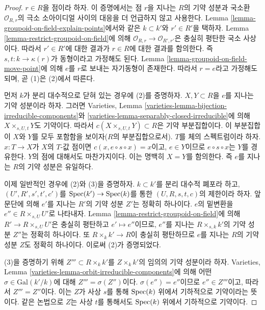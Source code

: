 \begin{proof}
$r \in R$을 점이라 하자. 이 증명에서는 점 $r$을 지나는 $R$의 기약 성분과
국소환 $\mathcal{O}_{R, r}$의 극소 소아이디얼 사이의 대응을 더 언급하지 않고
사용한다. Lemma \ref{lemma-groupoid-on-field-explain-points}에서와 같은
$k \subset k'$와 $r' \in R'$을 택하자. Lemma
\ref{lemma-restrict-groupoid-on-field}에 의해
$\mathcal{O}_{R, r} \to \mathcal{O}_{R', r'}$은 충실히 평탄한 국소 사상이다.
따라서 $r' \in R'$에 대한 결과가 $r \in R$에 대한 결과를 함의한다.
즉 $s, t : k \to \kappa(r)$가 동형이라고 가정해도 된다. Lemma
\ref{lemma-groupoid-on-field-move-point}에 의해 $e$를 $r$로 보내는
자기동형이 존재한다. 따라서 $r = e$라고 가정해도 되며, 곧 (1)은 (2)에서 따른다.

\medskip\noindent
먼저 $k$가 분리 대수적으로 닫혀 있는 경우에 (2)를 증명하자.
$X, Y \subset R$을 $e$를 지나는 기약 성분이라 하자. 그러면 Varieties, Lemma
\ref{varieties-lemma-bijection-irreducible-components}와
\ref{varieties-lemma-separably-closed-irreducible}에 의해
$X \times_{s, U, t} Y$도 기약이다. 따라서
$c(X \times_{s, U, t} Y) \subset R$은 기약 부분집합이다. 이 부분집합이
$X$와 $Y$를 모두 포함함을 보이자($R$의 부분집합으로서). $T$를 체의
스펙트럼이라 하자. $x : T \to X$가 $X$의 $T$-값 점이면
$c(x, e \circ s \circ x) = x$이고, $e \in Y$이므로
$e \circ s \circ x$는 $Y$를 경유한다. $Y$의 점에 대해서도 마찬가지이다.
이는 명백히 $X = Y$를 함의한다. 즉 $e$를 지나는 $R$의 기약 성분은 유일하다.

\medskip\noindent
이제 일반적인 경우에 (2)와 (3)을 증명하자. $k \subset k'$를 분리 대수적
폐포라 하고, $(U', R', s', t', c')$를 $\mathop{\mathrm{Spec}}(k') \to \mathop{\mathrm{Spec}}(k)$를 통한
$(U, R, s, t, c)$의 제한이라 하자. 앞 문단에 의해 $e'$를 지나는
$R'$의 기약 성분 $Z'$는 정확히 하나이다. $e$의 밑변환을
$e'' \in R \times_{s, U} U'$로 나타내자. Lemma
\ref{lemma-restrict-groupoid-on-field}에 의해
$R' \to R \times_{s, U} U'$은 충실히 평탄하고 $e' \mapsto e''$이므로,
$e''$를 지나는 $R \times_{s, k} k'$의 기약 성분 $Z''$는 정확히 하나이다.
또 $R \times_k k' \to R$이 충실히 평탄하므로 $e$를 지나는 $R$의
기약 성분 $Z$도 정확히 하나이다. 이로써 (2)가 증명되었다.

\medskip\noindent
(3)을 증명하기 위해 $Z''' \subset R \times_k k'$를
$Z \times_k k'$의 임의의 기약 성분이라 하자. Varieties, Lemma
\ref{varieties-lemma-orbit-irreducible-components}에 의해 어떤
$\sigma \in \text{Gal}(k'/k)$에 대해 $Z''' = \sigma(Z'')$이다.
$\sigma(e'') = e''$이므로 $e'' \in Z'''$이고, 따라서 $Z''' = Z''$이다.
이는 $Z$가 사상 $s$를 통해 $\mathop{\mathrm{Spec}}(k)$ 위에서 기하적으로 기약이라는 뜻이다.
같은 논법으로 $Z$는 사상 $t$를 통해서도 $\mathop{\mathrm{Spec}}(k)$ 위에서
기하적으로 기약이다.
\end{proof}

